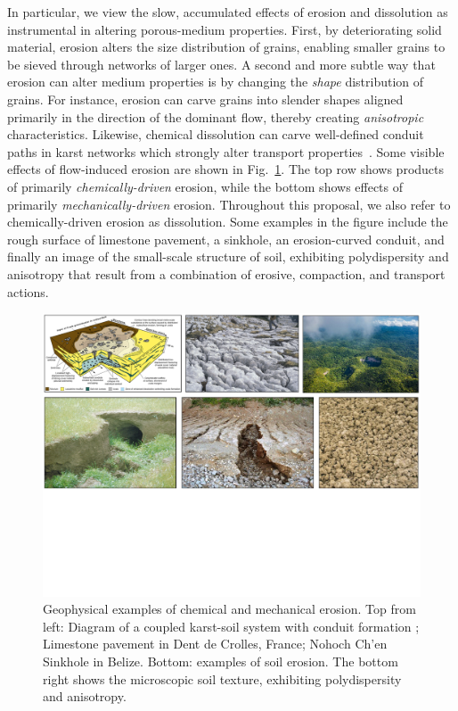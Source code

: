 \documentclass[11pt]{article}
\begin{document}
In particular, we view the slow, accumulated effects of erosion and dissolution as instrumental in altering porous-medium properties. First, by deteriorating solid material, erosion alters the size distribution of grains, enabling smaller grains to be sieved through networks of larger ones. A second and more subtle way that erosion can alter medium properties is by changing the {\em shape} distribution of grains. For instance, erosion can carve grains into slender shapes aligned primarily in the direction of the dominant flow, thereby creating {\em anisotropic} characteristics. Likewise, chemical dissolution can carve well-defined conduit paths in karst networks which strongly alter transport properties~\cite{szymczak2009wormhole}. Some visible effects of flow-induced erosion are shown in Fig.~\ref{collage}. The top row shows products of primarily {\em chemically-driven} erosion, while the bottom shows effects of primarily {\em mechanically-driven} erosion. Throughout this proposal, we also refer to chemically-driven erosion as dissolution. Some examples in the figure include the rough surface of limestone pavement, a sinkhole, an erosion-curved conduit, and finally an image of the small-scale structure of soil, exhibiting polydispersity and anisotropy that result from a combination of erosive, compaction, and transport actions.

\begin{figure}%
\begin{center}
\includegraphics[width = 0.99 \textwidth]{./figs/collage.pdf}
\caption{\label{collage} Geophysical examples of chemical and mechanical erosion. Top from left: Diagram of a coupled karst-soil system with conduit formation \cite{watson2019sinkholes}; Limestone pavement in Dent de Crolles, France; Nohoch Ch’en Sinkhole in Belize. Bottom: examples of soil erosion. The bottom right shows the microscopic soil texture, exhibiting polydispersity and anisotropy.}
\end{center}
\end{figure}
\end{document}
